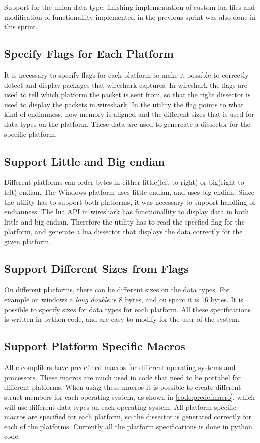 Support for the \gls{union} data type, finishing implementation of custom \Gls{lua} files 
and modification of functionallity implemented in the previous sprint was also 
done in this sprint.

\subsection{Specify Flags for Each Platform}
It is necessary to specify flags for each platform to make it possible to 
correctly detect and display packages that wireshark captures. In wireshark 
the flags are used to tell which platform the \gls{packet} is sent from, so that 
the right \gls{dissector} is used to display the packets in \Gls{wireshark}. In the 
\gls{utility} the flag points to what kind of \gls{endianness}, how memory is aligned and 
the different sizes that is used for data types on the platform. These data 
are used to genereate a \gls{dissector} for the specific platform.

\subsection{Support Little and Big \Gls{endian}}
Different platforms can order bytes in either little(left-to-right) or 
big(right-to-left) \gls{endian}. The \Gls{Windows} platform uses little \gls{endian}, and  
uses big \gls{endian}. Since the \gls{utility} has to support both platforms, it was 
necessary to support handling of \gls{endianness}. The \Gls{lua} API in wireshark has 
functionallity to display data in both little and big \gls{endian}. Therefore the 
\gls{utility} has to read the specfied flag for the platform, and generate a \Gls{lua} 
\gls{dissector} that displays the data correctly for the given platform.

\subsection{Support Different Sizes from Flags}
On different platforms, there can be different sizes on the data types. For 
example on windows a \emph{long double} is 8 bytes, and on sparc it is 16 
bytes. It is possible to specify sizes for data types for each platform. All 
these specifications is written in python code, and are easy to modify for the 
user of the system.

\subsection{Support Platform Specific Macros}
All c complilers have predefined macros for different operating systems and 
processors. These macros are much used in code that need to be portabel for 
different platforms. When using these macros it is possible to create 
different struct members for each operating system, as shown in 
\autoref{code:predefmacro}, which will use different data types on each 
operating system. All platform specific macros are specified for each 
platform, so the dissector is generated correctly for each of the platforms. 
Currently all the platform specifications is done in python code.

